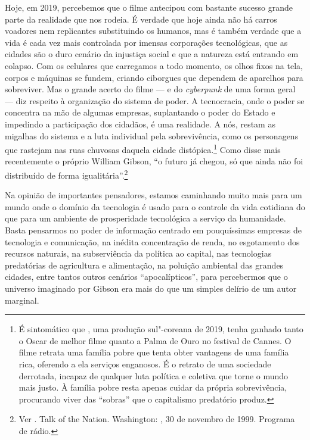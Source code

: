 Hoje, em 2019, percebemos que o filme antecipou com bastante sucesso
grande parte da realidade que nos rodeia. É verdade que hoje ainda não há carros voadores nem replicantes substituindo os humanos, mas é também verdade que a vida é cada vez mais controlada por imensas corporações tecnológicas, que as cidades são o duro cenário da injustiça social e que a natureza está entrando em colapso. Com os celulares que carregamos a todo momento, os
olhos fixos na tela, corpos e máquinas se fundem, criando ciborgues que
dependem de aparelhos para sobreviver. Mas o grande acerto do filme --- e
do \emph{cyberpunk} de uma forma geral --- diz respeito à organização do
sistema de poder. A tecnocracia, onde o poder se concentra na mão de
algumas empresas, suplantando o poder do Estado e impedindo a
participação dos cidadãos, é uma realidade. A nós, restam as migalhas do
sistema e a luta individual pela sobrevivência, como os personagens que
rastejam nas ruas chuvosas daquela cidade distópica.\footnote{É sintomático que {}, uma produção sul"-coreana de 2019, tenha ganhado tanto o Oscar de melhor filme quanto a Palma de Ouro no festival de Cannes. O filme retrata uma família pobre que tenta obter vantagens de uma família rica, oferendo a ela serviços enganosos. É o retrato de uma sociedade derrotada, incapaz de qualquer luta política e coletiva que torne o mundo mais justo. À família pobre resta apenas cuidar da própria sobrevivência, procurando viver das ``sobras'' que o capitalismo predatório produz.} Como disse mais recentemente o próprio William Gibson, ``o futuro já chegou, só que ainda não foi distribuído de forma igualitária''.\footnote{Ver . Talk of the Nation. Washington: , 30 de novembro de 1999. Programa de rádio.}

Na opinião de importantes pensadores, estamos caminhando muito mais para
um mundo onde o domínio da tecnologia é usado para o controle da vida
cotidiana do que para um ambiente de prosperidade tecnológica a serviço
da humanidade. Basta pensarmos no poder de informação centrado em
pouquíssimas empresas de tecnologia e comunicação, na inédita
concentração de renda, no esgotamento dos recursos naturais, na
subserviência da política ao capital, nas tecnologias predatórias de
agricultura e alimentação, na poluição ambiental das grandes cidades,
entre tantos outros cenários ``apocalípticos'', para percebermos que o
universo imaginado por Gibson era mais do que um simples delírio de um
autor marginal.

